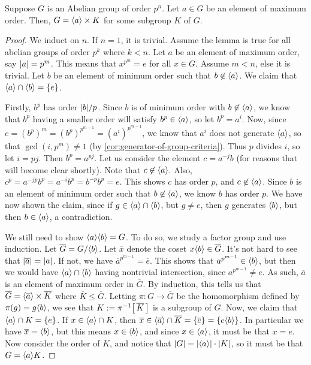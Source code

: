 \documentclass[./main.tex]{subfiles}
\begin{document}
\begin{lemma}
\label{lem:lemma-prime-power-order-abelian-groups-factorization}
    Suppose $G$ is an Abelian group of order $p^n$. Let $a \in G$ be an element
    of maximum order. Then, $G = { \langle a \rangle } \times K$ for some subgroup $K$ of $G$.
\end{lemma}
\begin{proof}
    We induct on $n$. If $n=1$, it is trivial. Assume the lemma is true for all
    abelian groups of order $p^k$ where $k < n$. Let $a$ be an element of
    maximum order, say $\abs a = p^m$. This means that $x^{p^m} = e$ for all $x
    \in G$. Assume $m < n$, else it is trivial. Let $b$ be an element of minimum
    order such that $b \not \in { \langle a \rangle }$. We claim that ${ \langle a \rangle } \cap { \langle b \rangle } =
    \{e\}$. 
    
    Firstly, $b^p$ has order $\abs b/p$. Since $b$ is of minimum order with $b
    \not\in { \langle a \rangle }$, we know that $b^p$ having a smaller order will satisfy $b^p
    \in { \langle a \rangle }$, so let $b^p = a^i$. Now, since $e = (b^p)^m = (b^p)^{p^{m-1}} =
    (a^i)^{p^{m-1}}$, we know that $a^i$ does not generate ${ \langle a \rangle }$, so that
    $\gcd(i, p^m) \neq 1$ (by \cref{cor:generator-of-group-criteria}). Thus $p$
    divides $i$, so let $i = pj$. Then $b^p = a^{pj}$. Let us consider the
    element $c = a^{-j}b$ (for reasons that will become clear shortly). Note
    that $c \not\in { \langle a \rangle }$. Also, $c^p = a^{-jp}b^p = a^{-i}b^p = b^{-p} b^p =
    e$. This shows $c$ has order $p$, and $c \not\in { \langle a \rangle }$. Since $b$ is an
    element of minimum order such that $b \not\in { \langle a \rangle }$, we know $b$ has order
    $p$. We have now shown the claim, since if $g \in { \langle a \rangle } \cap { \langle b \rangle }$, but
    $g \neq e$, then $g$ generates ${ \langle b \rangle }$, but then $b \in { \langle a \rangle }$, a contradiction.

    We still need to show ${ \langle a \rangle } { \langle b \rangle } = G$. To do so, we study a factor group
    and use induction. Let $\overline G = G / { \langle b \rangle }$. Let $\overline x$ denote
    the coset $x { \langle b \rangle } \in \overline G$. It's not hard to see that
    $\abs{\overline a} = \abs a$. If not, we have $\overline{a}^{p^{m-1}} =
    \overline e$. This shows that $a^{p^{m-1}} \in { \langle b \rangle }$, but then we would
    have ${ \langle a \rangle } \cap { \langle b \rangle }$ having nontrivial intersection, since $a^{p^{m-1}}
    \neq e$. As such, $\overline a$ is an element of maximum order in $\overline
    G$. By induction, this tells us that $\overline G = { \langle \overline a \rangle } \times
    \overline K$ where $\overline K \leq \overline G$. Letting $\pi: G \to
    \overline G$ be the homomorphism defined by $\pi(g) = g { \langle b \rangle }$, we see that
    $K := \pi\inv\Paren*{\,\overline K\,}$ is a subgroup of $G$. Now, we claim
    that ${ \langle a \rangle } \cap K = \{e\}$. If $x \in { \langle a \rangle } \cap K$, then $\overline x
    \in { \langle \overline a \rangle } \cap \overline K = \{\overline e \} = \{ e{ \langle b \rangle } \}$.
    In particular we have $\overline x = { \langle b \rangle }$, but this means $x \in { \langle b \rangle }$,
    and since $x \in { \langle a \rangle }$, it must be that $x = e$. Now consider the order of
    $K$, and notice that $\abs G = \abs {\gen a} \cdot \abs K$, so it must be
    that $G = { \langle a \rangle } K$. 
\end{proof}
\end{document}
